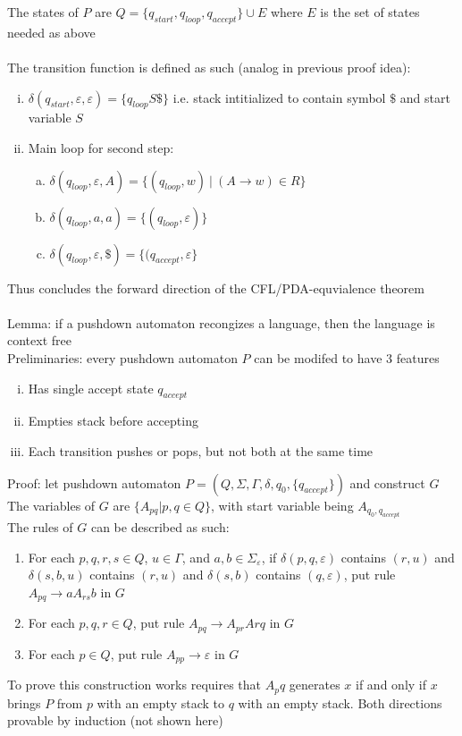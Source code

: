 \documentclass{article}
\newcommand*{\<}{\langle}
\renewcommand*{\>}{\rangle}
\begin{document}
			The states of $P$ are $Q = \{q_{start}, q_{loop}, q_{accept}\} \cup E$ where $E$ is the set of states needed as above \\
			\\
			The transition function is defined as such (analog in previous proof idea): 
			\begin{enumerate}[(i)]
				\item $\delta(q_{start}, \varepsilon, \varepsilon) = \{q_{loop} S\$\}$ i.e. stack intitialized to contain symbol $\$$ and start variable $S$
				\item Main loop for second step:
				\begin{enumerate}[(a)]
					\item $\delta(q_{loop}, \varepsilon, A) = \{(q_{loop}, w)\:|\:(A \to w) \in R\}$
					\item $\delta(q_{loop}, a, a) = \{(q_{loop}, \varepsilon)\}$
					\item $\delta(q_{loop}, \varepsilon, \$) = \{(q_{accept}, \varepsilon\}$ 
					\end{enumerate}
				\end{enumerate}
			Thus concludes the forward direction of the CFL/PDA-equvialence theorem \\
			\\
			Lemma: if a pushdown automaton recongizes a language, then the language is context free \\
			Preliminaries: every pushdown automaton $P$ can be modifed to have 3 features
			\begin{enumerate}[(i)]
				\item Has single accept state $q_{accept}$
				\item Empties stack before accepting
				\item Each transition pushes or pops, but not both at the same time
				\end{enumerate}
			Proof: let pushdown automaton $P = (Q, \Sigma, \Gamma, \delta, q_0, \{q_{accept}\})$ and construct $G$ \\
			The variables of $G$ are $\{A_{pq} | p, q \in Q\}$, with start variable being $A_{q_0, q_{accept}}$ \\
			The rules of $G$ can be described as such:
			\begin{enumerate}
				\item For each $p, q, r, s \in Q$, $u \in \Gamma$, and $a, b \in \Sigma_\varepsilon$, if $\delta(p, q, \varepsilon)$ contains $(r, u)$ and $\delta(s, b, u)$ contains $(r, u)$ and $\delta(s, b)$ contains $(q, \varepsilon)$, put rule $A_{pq} \to aA_{rs}b$ in $G$
				\item For each $p, q, r \in Q$, put rule $A_{pq} \to A_{pr}A{rq}$ in $G$
				\item For each $p \in Q$, put rule $A_{pp} \to \varepsilon$ in $G$
				\end{enumerate}
			To prove this construction works requires that $A_pq$ generates $x$ if and only if $x$ brings $P$ from $p$ with an empty stack to $q$ with an empty stack. Both directions provable by induction (not shown here) 
\end{document}
